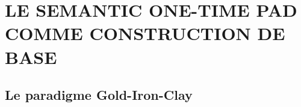 
\section{LE SEMANTIC ONE-TIME PAD COMME CONSTRUCTION DE BASE}
\label{sec:sotp_base}

\subsection{Le paradigme Gold-Iron-Clay}
\label{subsec:gold_iron_clay}
